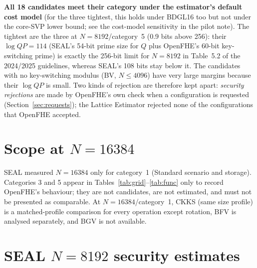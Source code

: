 \documentclass[11pt]{article}
\begin{document}
{\footnotesize\setlength{\tabcolsep}{3pt}
}
\vspace{-6pt}

\textbf{All 18 candidates meet their category under the estimator's default cost model} (for the three tightest, this holds under BDGL16 too but not under the core-SVP lower bound; see the cost-model sensitivity in the pilot note). The tightest are the three at $N{=}8192$/category~5 (0.9 bits above 256): their $\log QP = 114$ (SEAL's 54-bit prime size for $Q$ plus OpenFHE's 60-bit key-switching prime) is exactly the 256-bit limit for $N{=}8192$ in Table~5.2 of the 2024/2025 guidelines, whereas SEAL's 108 bits stay below it. The candidates with no key-switching modulus (BV, $N \le 4096$) have very large margins because their $\log QP$ is small. Two kinds of rejection are therefore kept apart: \emph{security rejections} are made by OpenFHE's own check when a configuration is requested (Section~\ref{sec:requests}); the Lattice Estimator rejected none of the configurations that OpenFHE accepted.

\section{Scope at \texorpdfstring{$N{=}16384$}{N=16384}}
\label{sec:scope}

SEAL measured $N{=}16384$ only for category~1 (Standard scenario and storage). Categories 3 and 5 appear in Tables~\ref{tab:grid}--\ref{tab:func} only to record OpenFHE's behaviour; they are not candidates, are not estimated, and must not be presented as comparable. At $N{=}16384$/category~1, CKKS (same size profile) is a matched-profile comparison for every operation except rotation, BFV is analysed separately, and BGV is not available.

\section{SEAL \texorpdfstring{$N{=}8192$}{N=8192} security estimates}
\label{sec:seal8192}
\end{document}
